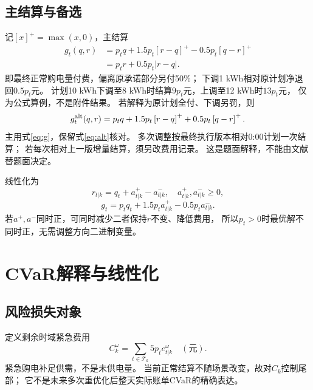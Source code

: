 \documentclass[UTF8,11pt]{ctexart}
\newcommand{\pos}[1]{\left[#1\right]^+}
\begin{document}
\subsection{主结算与备选}
记$\pos{x}=\max(x,0)$，主结算
\begin{align}
 g_t(q,r)&=p_tq+1.5p_t\pos{r-q}-0.5p_t\pos{q-r}\label{eq:g}\\
 &=p_tr+0.5p_t|r-q|.
\end{align}
即最终正常购电量付费，偏离原承诺部分另付50\%；
下调1 kWh相对原计划净退回$0.5p_t$元。
计划10 kWh下调至8 kWh时结算$9p_t$元，上调至12 kWh时$13p_t$元，
仅为公式算例，不是附件结果。
若解释为原计划全付、下调另罚，则
\begin{equation}\label{eq:alt}
 g_t^{\rm alt}(q,r)=p_tq+1.5p_t\pos{r-q}+0.5p_t\pos{q-r}.
\end{equation}
主用式\eqref{eq:g}，保留式\eqref{eq:alt}核对。
多次调整按最终执行版本相对0:00计划一次结算；
若每次相对上一版增量结算，须另改费用记录。
这是题面解释，不能由文献替题面决定。

线性化为
\begin{equation}\label{eq:adjust}
 r_{t|k}=q_t+a^+_{t|k}-a^-_{t|k},\quad a^+_{t|k},a^-_{t|k}\geq0,
\end{equation}
\begin{equation}
 g_t=p_tq_t+1.5p_ta^+_{t|k}-0.5p_ta^-_{t|k}.
\end{equation}
若$a^+,a^-$同时正，可同时减少二者保持$r$不变、降低费用，
所以$p_t>0$时最优解不同时正，无需调整方向二进制变量。

\section{CVaR解释与线性化}
\subsection{风险损失对象}
定义剩余时域紧急费用
\begin{equation}\label{eq:loss}
 C_k^\omega=\sum_{t\in\mathcal T_k}5p_te^\omega_{t|k}\quad(\text{元}).
\end{equation}
紧急购电补足供需，不是未供电量。
当前正常结算不随场景改变，故对$C_k$控制尾部；
它不是未来多次重优化后整天实际账单CVaR的精确表达。
\end{document}
